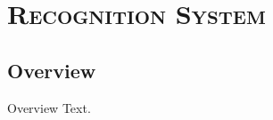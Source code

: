 \section{\scshape Recognition System}\label{sec:methodology}

\subsection{Overview}
\begin{frame}{Overview}
	Text.
\end{frame}
